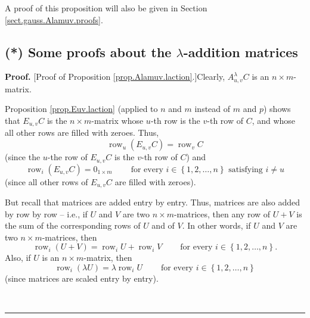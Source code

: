 \documentclass[numbers=enddot,12pt,final,onecolumn,notitlepage]{scrartcl}%
\theoremstyle{definition}
\newenvironment{proof}[1][Proof]{\noindent\textbf{#1.} }{\ \rule{0.5em}{0.5em}}
\begin{document}
A proof of this proposition will also be given in Section
\ref{sect.gauss.Alamuv.proofs}.

\subsection{\label{sect.gauss.Alamuv.proofs}(*) Some proofs about the
$\lambda$-addition matrices}

\begin{proof}
[Proof of Proposition \ref{prop.Alamuv.laction}.]Clearly, $A_{u,v}^{\lambda}C$
is an $n\times m$-matrix.

Proposition \ref{prop.Euv.laction} (applied to $n$ and $m$ instead of $m$ and
$p$) shows that $E_{u,v}C$ is the $n\times m$-matrix whose $u$-th row is the
$v$-th row of $C$, and whose all other rows are filled with zeroes. Thus,%
\begin{equation}
\operatorname*{row}\nolimits_{u}\left(  E_{u,v}C\right)  =\operatorname*{row}%
\nolimits_{v}C \label{pf.prop.Alamuv.laction.1}%
\end{equation}
(since the $u$-the row of $E_{u,v}C$ is the $v$-th row of $C$) and%
\begin{equation}
\operatorname*{row}\nolimits_{i}\left(  E_{u,v}C\right)  =0_{1\times
m}\ \ \ \ \ \ \ \ \ \ \text{for every }i\in\left\{  1,2,\ldots,n\right\}
\text{ satisfying }i\neq u \label{pf.prop.Alamuv.laction.2}%
\end{equation}
(since all other rows of $E_{u,v}C$ are filled with zeroes).

But recall that matrices are added entry by entry. Thus, matrices are also
added by row by row -- i.e., if $U$ and $V$ are two $n\times m$-matrices, then
any row of $U+V$ is the sum of the corresponding rows of $U$ and of $V$. In
other words, if $U$ and $V$ are two $n\times m$-matrices, then%
\begin{equation}
\operatorname*{row}\nolimits_{i}\left(  U+V\right)  =\operatorname*{row}%
\nolimits_{i}U+\operatorname*{row}\nolimits_{i}V\ \ \ \ \ \ \ \ \ \ \text{for
every }i\in\left\{  1,2,\ldots,n\right\}  . \label{pf.prop.Alamuv.laction.5}%
\end{equation}
Also, if $U$ is an $n\times m$-matrix, then%
\begin{equation}
\operatorname*{row}\nolimits_{i}\left(  \lambda U\right)  =\lambda
\operatorname*{row}\nolimits_{i}U\ \ \ \ \ \ \ \ \ \ \text{for every }%
i\in\left\{  1,2,\ldots,n\right\}  \label{pf.prop.Alamuv.laction.6}%
\end{equation}
(since matrices are scaled entry by entry).


\end{proof}
\end{document}
